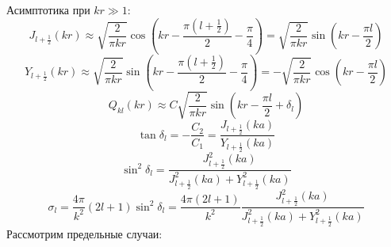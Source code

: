 \documentclass[12pt]{article}
\theoremstyle{definition}
\begin{document}
Асимптотика при $kr\gg1$:
\begin{equation}
    J_{l+\frac{1}{2}}(kr)\approx\sqrt{\frac{2}{\pi kr}}\cos\left(kr-\frac{\pi(l+\frac{1}{2})}{2}-\frac{\pi}{4}\right)=\sqrt{\frac{2}{\pi kr}}\sin\left(kr-\frac{\pi l}{2}\right)
\end{equation}
\begin{equation}
    Y_{l+\frac{1}{2}}(kr)\approx\sqrt{\frac{2}{\pi kr}}\sin\left(kr-\frac{\pi(l+\frac{1}{2})}{2}-\frac{\pi}{4}\right)=-\sqrt{\frac{2}{\pi kr}}\cos\left(kr-\frac{\pi l}{2}\right)
\end{equation}
\begin{equation}
    Q_{kl}(kr)\approx C\sqrt{\frac{2}{\pi kr}}\sin\left(kr-\frac{\pi l}{2}+\delta_l\right)
\end{equation}
\begin{equation}
    \tan\delta_l=-\frac{C_2}{C_1}=\frac{J_{l+\frac{1}{2}}(ka)}{Y_{l+\frac{1}{2}}(ka)}
\end{equation}
\begin{equation}
    \sin^2\delta_l=\frac{J^2_{l+\frac{1}{2}}(ka)}{J^2_{l+\frac{1}{2}}(ka)+Y^2_{l+\frac{1}{2}}(ka)}
\end{equation}
\begin{equation}
    \boxed{\sigma_l=\frac{4\pi}{k^2}(2l+1)\sin^2\delta_l=\frac{4\pi(2l+1)}{k^2}\frac{J^2_{l+\frac{1}{2}}(ka)}{J^2_{l+\frac{1}{2}}(ka)+Y^2_{l+\frac{1}{2}}(ka)}}
\end{equation}
Рассмотрим предельные случаи:
\end{document}
